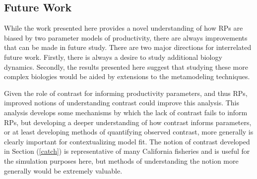 \documentclass[12pt]{ucscthesis}
\begin{document}
\subsection{Future Work}

While the work presented here provides a novel understanding of how RPs are 
biased by two parameter models of productivity, there are always improvements 
that can be made in future study. There are two major directions for 
interrelated future work. Firstly, there is always a desire to study additional 
biology dynamics. Secondly, the results presented here suggest that studying 
these more complex biologies would be aided by extensions to the metamodeling 
techniques.


%
Given the role of contrast for informing productivity parameters, and thus RPs, 
improved notions of understanding contrast could improve this analysis. This 
analysis develops some mechanisms by which the lack of contrast fails to 
inform RPs, but developing a deeper understanding of how contrast informs 
parameters, or at least developing methods of quantifying observed contrast, 
more generally is clearly important for contextualizing model fit. The notion 
of contrast developed in Section (\ref{catch}) is representative of many 
California fisheries and is useful for the simulation purposes here, but 
methods of understanding the notion more generally would be extremely valuable.  
\end{document}
